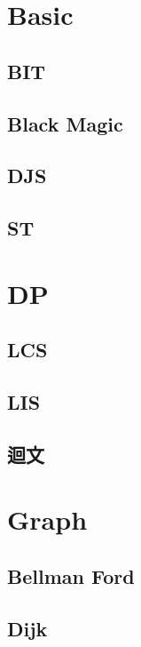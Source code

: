 \section{Basic}
    \subsection{BIT}
        
    \subsection{Black Magic}
        
    \subsection{DJS}
            
    \subsection{ST}
        

\section{DP}
    \subsection{LCS}
        
    \subsection{LIS}
        
    \subsection{迴文}
        

\section{Graph}
    \subsection{Bellman Ford}
        
    \subsection{Dijk}
        
